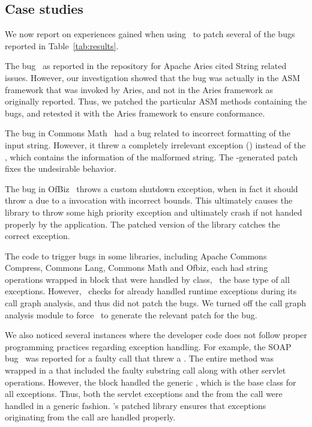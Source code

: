 \subsection{Case studies}
\label{sub:casestudies}

We now report on experiences gained when using \tool\ to patch several of the
bugs reported in Table~\ref{tab:results}.

\begin{mylist}

 \item The bug~\cite{ARIES1204} as reported in the repository for Apache Aries
cited String related issues. However, our investigation showed that the bug was
actually in the ASM framework that was invoked by Aries, and not in the Aries
framework as originally reported. Thus, we patched the particular ASM methods
containing the bugs, and retested it with the Aries framework to ensure
conformance.

 \item The bug in Commons Math~\cite{MATH198} had a bug related to incorrect
formatting of the input string. However, it threw a completely irrelevant
exception () instead of the ,
which contains the information of the malformed string. The \tool-generated
patch fixes the undesirable behavior.

 \item The bug in OfBiz~\cite{OFBIZ4237} throws a custom shutdown exception,
when in fact it should throw a  due to a
 invocation with incorrect bounds. This ultimately causes the
library to throw some high priority exception and ultimately crash if not handed
properly by the application. The patched version of the library catches the
correct exception.

 \item The code to trigger bugs in some libraries, including Apache Commons
Compress, Commons Lang, Commons Math and Ofbiz, each had string operations
wrapped in  block that were handled by  class,
\ie\ the base type of all exceptions. However, \tool\ checks for already
handled runtime exceptions during its call graph analysis, and thus did not
patch the bugs. We turned off the call graph analysis module to force \tool\ to
generate the relevant patch for the bug.

 \item We also noticed several instances where the developer code does not
follow proper programming practices regarding exception handling. For example,
the SOAP bug~\cite{SOAP130} was reported for a faulty  call that
threw a . The entire method was wrapped in
a  that included the faulty substring call along with other
servlet operations. However, the  block handled the generic
, which is the base class for all exceptions. Thus, both the
servlet exceptions and the  from the
 call were handled in a generic fashion. \tool's patched library
ensures that exceptions originating from the  call are handled
properly.

\end{mylist}